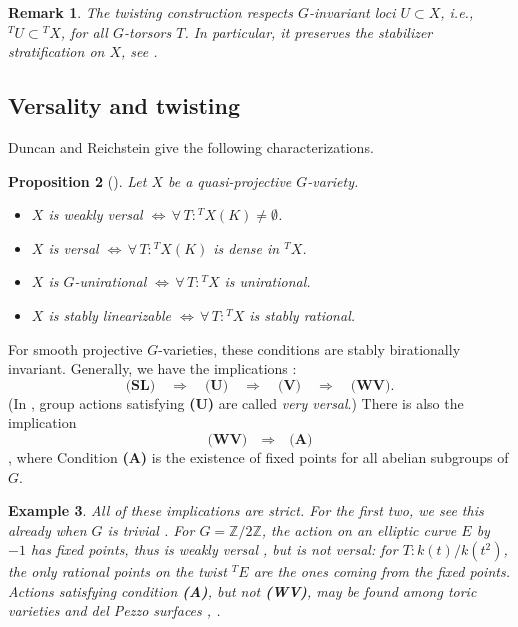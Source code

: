 \documentclass[10pt,a4paper]{amsart}
\numberwithin{equation}{section}
\newtheorem{prop}{Proposition}[section]
\newtheorem{exam}[prop]{Example}
\newtheorem{rema}[prop]{Remark}
\def\bZ{{\mathbb Z}}
\begin{document}
\begin{rema}
    \label{rema:twist-stab}
The twisting construction respects $G$-invariant loci $U\subset X$, i.e.,
${}^TU\subset {}^TX$, for all $G$-torsors $T$. In particular, it preserves the stabilizer stratification on $X$, see \cite[Sect.\ 6.1]{KTsurvey}.
\end{rema}









\subsection*{Versality and twisting}



Duncan and Reichstein give the following characterizations.

\begin{prop}[{\cite{DR}}]
\label{prop.DR}
Let $X$ be a quasi-projective $G$-variety.
\begin{itemize}
\item[(i)] $X$ is weakly versal $\Leftrightarrow\,\forall\,T\colon{}^TX(K)\ne \emptyset$.
\item[(ii)] $X$ is versal $\Leftrightarrow\,\forall\,T\colon{}^TX(K)$ is dense in ${}^TX$.
\item[(iii)] $X$ is $G$-unirational $\Leftrightarrow\,\forall\,T\colon{}^TX$ is unirational.
\item[(iv)] $X$ is stably linearizable $\Leftrightarrow\,\forall\,T\colon{}^TX$ is stably rational.
\end{itemize}
\end{prop}

For smooth projective $G$-varieties, these conditions are stably birationally invariant.
Generally, we have the implications \cite[(1.1)]{DR}:
\[ \textbf{(SL)}\quad\Rightarrow\quad \textbf{(U)}\quad\Rightarrow\quad \textbf{(V)}\quad\Rightarrow\quad \textbf{(WV)}. \]
(In \cite{DR}, group actions satisfying \textbf{(U)} are called \emph{very versal}.) 
There is also the implication
\[ \textbf{(WV)}\quad\Rightarrow\quad \textbf{(A)} \]
\cite[Rmk.\ 2.7]{DR},
where Condition \textbf{(A)} is the existence of fixed points for all abelian subgroups of $G$.

\begin{exam}
\label{exa.WVV}
All of these implications are strict.
For the first two, we see this already when
$G$ is trivial \cite[Sect.\ 1]{DR}.
For $G=\bZ/2\bZ$, the action on an elliptic curve $E$ by $-1$ has fixed points, thus is weakly versal \cite[Prop.\ 2.2]{DR}, but is not versal:
for $T\colon k(t)/k(t^2)$, the only rational points on the twist ${}^TE$ are the ones coming from the fixed points.
Actions satisfying condition \textbf{(A)}, but not \textbf{(WV)}, may be found among toric varieties and del Pezzo surfaces \cite{KT-uni}, \cite{STZ}.
\end{exam}
\end{document}
